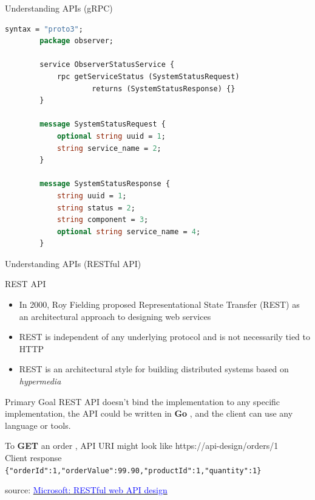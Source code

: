 \documentclass{beamer}
\newcommand{\code}[1]{\colorbox{codegray}{\texttt{#1}}}
\begin{document}
\begin{frame}[fragile,t]{Understanding APIs \small (gRPC)}  
	
	\scriptsize
      \begin{lstlisting}[language=protobuf]
		syntax = "proto3";
		package observer;

		service ObserverStatusService {
    		rpc getServiceStatus (SystemStatusRequest) 
    				returns (SystemStatusResponse) {}
		}

		message SystemStatusRequest {
    		optional string uuid = 1;
    		string service_name = 2;
		}

		message SystemStatusResponse {
    		string uuid = 1;
    		string status = 2;
    		string component = 3;
    		optional string service_name = 4;
		}
      \end{lstlisting}
  
\end{frame}


\begin{frame}[t]{Understanding APIs \small (RESTful API)}
  
    \scriptsize 
  \begin{block}{REST API}  
   \begin{itemize}
    \scriptsize 
   	\item In 2000, Roy Fielding proposed Representational State Transfer (REST) as an architectural approach to designing web services
   	\item REST is independent of any underlying protocol and is not necessarily tied to HTTP
   	\item REST is an architectural style for building distributed systems based on \textit{hypermedia}
   \end{itemize}	   
  \end{block}  
  
    \scriptsize  
  \begin{block}{Primary Goal}  
  \scriptsize
	 {REST API doesn't bind the implementation to any specific implementation, the API could be written in \textbf{Go} , and the client can use any language or tools.}	   
  \end{block}  
  
  \scriptsize
  \begin{example}
  	  	\scriptsize To \textbf{GET} an order , API URI might look like https://api-design/orders/1 \\
  		\scriptsize Client response \code {\{"orderId":1,"orderValue":99.90,"productId":1,"quantity":1\}}
  \end{example}
  
  \tiny { source: \href{https://learn.microsoft.com/en-us/azure/architecture/best-practices/api-design}
  		{\textcolor{blue}{Microsoft: RESTful web API design}}}
  
\end{frame}
\end{document}
